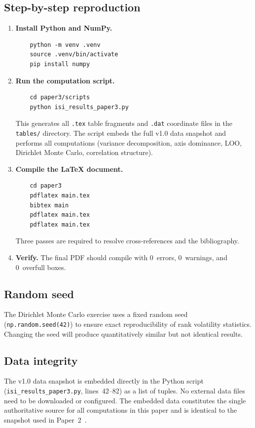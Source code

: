 \subsection{Step-by-step reproduction}

\begin{enumerate}[leftmargin=2em]
  \item \textbf{Install Python and NumPy.}
    \begin{verbatim}
    python -m venv .venv
    source .venv/bin/activate
    pip install numpy
    \end{verbatim}

  \item \textbf{Run the computation script.}
    \begin{verbatim}
    cd paper3/scripts
    python isi_results_paper3.py
    \end{verbatim}
    This generates all \texttt{.tex} table fragments and
    \texttt{.dat} coordinate files in the \texttt{tables/} directory.
    The script embeds the full {\ISI} v1.0 data snapshot and performs
    all computations (variance decomposition, axis dominance, LOO,
    Dirichlet Monte Carlo, correlation structure).

  \item \textbf{Compile the LaTeX document.}
    \begin{verbatim}
    cd paper3
    pdflatex main.tex
    bibtex main
    pdflatex main.tex
    pdflatex main.tex
    \end{verbatim}
    Three passes are required to resolve cross-references and the
    bibliography.

  \item \textbf{Verify.}  The final PDF should compile with
    0~errors, 0~warnings, and 0~overfull boxes.
\end{enumerate}

\subsection{Random seed}

The Dirichlet Monte Carlo exercise uses a fixed random seed
(\texttt{np.random.seed(42)}) to ensure exact reproducibility of
rank volatility statistics.  Changing the seed will produce
quantitatively similar but not identical results.

\subsection{Data integrity}

\begin{sloppypar}
The {\ISI} v1.0 data snapshot is embedded directly in the Python
script (\texttt{isi\_results\_\allowbreak paper3.py},
lines~42--82) as a list of tuples.
No external data files need to be downloaded or configured.  The
embedded data constitutes the single authoritative source for all
computations in this paper and is identical to the snapshot used in
Paper~2~\cite{isi_paper2}.
\end{sloppypar}
